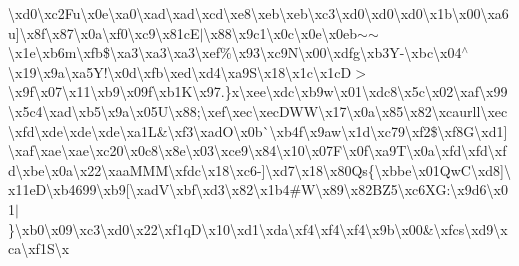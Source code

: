 \textbackslash{}xd0\textbackslash{}xc2\+Fu\textbackslash{}x0e\textbackslash{}xa0\textbackslash{}xad\textbackslash{}xad\textbackslash{}xcd\textquotesingle{}\textbackslash{}xe8\textbackslash{}xeb\textbackslash{}xeb\textbackslash{}xc3\textbackslash{}xd0\textbackslash{}xd0\textbackslash{}xd0\textbackslash{}x1b\textbackslash{}x00\textbackslash{}xa6u\mbox{]}\textbackslash{}x8f\textbackslash{}x87\textbackslash{}x0a\textbackslash{}xf0\textbackslash{}xc9\textbackslash{}x81c\+E$\vert$\textbackslash{}x88\textbackslash{}x9c1\textbackslash{}x0c\textbackslash{}x0e\textbackslash{}x0eb$\sim$$\sim$\textbackslash{}x1e\textbackslash{}xb6m\textbackslash{}xfb\$\textbackslash{}xa3\textbackslash{}xa3\textbackslash{}xa3\textbackslash{}xef\%\textbackslash{}x93\textbackslash{}xc9\+N\textbackslash{}x00\textbackslash{}xdfg\textbackslash{}xb3\+Y-\/\textbackslash{}xbc\textbackslash{}x04$^\wedge$\textbackslash{}x19\textbackslash{}x9a\textbackslash{}xa5\+Y!\textbackslash{}x0d\textbackslash{}xfb\textbackslash{}xed\textbackslash{}xd4\textbackslash{}xa9\+S\textbackslash{}x18\textbackslash{}x1c\textbackslash{}x1c\+D$>$\textbackslash{}x9f\textbackslash{}x07\textbackslash{}x11\textbackslash{}xb9\textbackslash{}x09f\textbackslash{}xb1\+K\textbackslash{}x97.\}x\textbackslash{}xee\textbackslash{}xdc\textbackslash{}xb9w\textbackslash{}x01\textbackslash{}xdc8\textbackslash{}x5c\textbackslash{}x02\textbackslash{}xaf\textbackslash{}x99\textbackslash{}x5c4\textbackslash{}xad\textbackslash{}xb5\textbackslash{}x9a\textbackslash{}x05\+U\textbackslash{}x88;\textbackslash{}xef\textbackslash{}xec\textbackslash{}xec\+D\+W\+W\textbackslash{}x17\textbackslash{}x0a\textbackslash{}x85\textbackslash{}x82\textbackslash{}xcaurll\textbackslash{}xec\textbackslash{}xfd\textbackslash{}xde\textbackslash{}xde\textbackslash{}xde\textbackslash{}xa1\+L\&\textbackslash{}xf3\textbackslash{}xad\+O\textbackslash{}x0b\`{}\textbackslash{}xb4f\textbackslash{}x9aw\textbackslash{}x1d\textbackslash{}xc79\textbackslash{}xf2\$\textbackslash{}xf8\+G\textbackslash{}xd1\mbox{]}\textbackslash{}xaf\textbackslash{}xae\textbackslash{}xae\textbackslash{}xc20\textbackslash{}x0c8\textbackslash{}x8e\textbackslash{}x03\textbackslash{}xce9\textbackslash{}x84\textbackslash{}x10\textbackslash{}x07\+F\textbackslash{}x0f\textbackslash{}xa9\+T\textbackslash{}x0a\textbackslash{}xfd\textbackslash{}xfd\textbackslash{}xfd\textbackslash{}xbe\textbackslash{}x0a\textbackslash{}x22\textbackslash{}xaa\+M\+M\+M\textbackslash{}xfdc\textbackslash{}x18\textbackslash{}xc6-\/\mbox{]}\textbackslash{}xd7\textquotesingle{}\textbackslash{}x18\textbackslash{}x80\+Qs\{\textbackslash{}xbbe\textbackslash{}x01\+Qw\+C\textbackslash{}xd8\mbox{]}\textbackslash{}x11e\+D\textbackslash{}xb4699\textbackslash{}xb9\mbox{[}\textbackslash{}xad\+V\textbackslash{}xbf\textbackslash{}xd3\textbackslash{}x82\textbackslash{}x1b4\#\+W\textbackslash{}x89\textbackslash{}x82\+B\+Z5\textbackslash{}xc6\+X\+G\+:\textbackslash{}x9d6\textbackslash{}x01$\vert$\}\textbackslash{}xb0\textbackslash{}x09\textbackslash{}xc3\textbackslash{}xd0\textbackslash{}x22\textbackslash{}xf1q\+D\textbackslash{}x10\textbackslash{}xd1\textbackslash{}xda\textbackslash{}xf4\textbackslash{}xf4\textbackslash{}xf4\textbackslash{}x9b\textbackslash{}x00\&\textbackslash{}xfcs\textbackslash{}xd9\textbackslash{}xca\textbackslash{}xf1\+S\textbackslash{}x